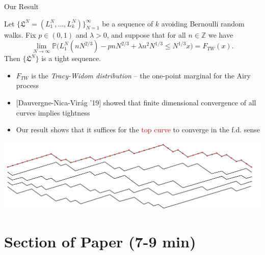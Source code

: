 \documentclass[9pt,t,dvipsnames]{beamer}
\begin{document}
\begin{frame}{Our Result}
\begin{theorem}[DFFSTWZ] Let $\{\mathfrak{L}^N = (L_1^N,\dots,L_k^N)\}_{N=1}^\infty$ be a sequence of $k$ avoiding Bernoulli random walks. Fix $p\in(0,1)$ and $\lambda > 0$, and suppose that for all $n\in\mathbb{Z}$ we have
\[
\lim_{N\to\infty} \mathbb{P}\big(L_1^{N}(nN^{2/3}) - pnN^{2/3} + \lambda n^2 N^{1/3} \leq N^{1/3} x \big) = F_{TW}(x).
\]
Then $\{\mathfrak{L}^N\}$ is a tight sequence.
\end{theorem}

\begin{itemize}
	\item $F_{TW}$ is the \textit{Tracy-Widom distribution} -- the one-point marginal for the Airy process
	
	\item {[Dauvergne-Nica-Vir\'{a}g '19]} showed that finite dimensional convergence of all curves implies tightness
	
	\item Our result shows that it suffices for the \textcolor{red}{top curve} to converge in the f.d. sense
\end{itemize}
\begin{center}
	\includegraphics[scale=0.25]{graphics/ConvToTW.jpg}
\end{center}
\end{frame}


\section{Section of Paper (7-9 min)}
\end{document}
